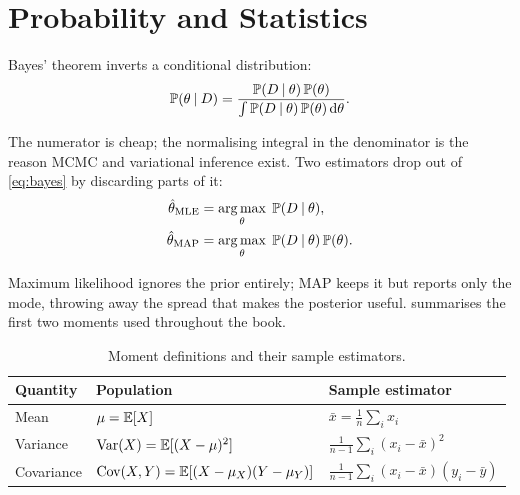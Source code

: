 \section{Probability and Statistics}
\label{sec:probability}

Bayes' theorem inverts a conditional distribution:
%
\begin{equation}
    \mathbb{P}(\theta \mathbin{\vert} D)
        = \frac{\mathbb{P}(D \mathbin{\vert} \theta)\,\mathbb{P}(\theta)}
               {\int \mathbb{P}(D \mathbin{\vert} \theta)\,\mathbb{P}(\theta)\,\mathrm{d}\theta} .
    \label{eq:bayes}
\end{equation}

The numerator is cheap; the normalising integral in the denominator is the
reason MCMC and variational inference exist. Two estimators drop out of
\cref{eq:bayes} by discarding parts of it:
%
\begin{align}
    \hat{\theta}_{\mathrm{MLE}} &= \operatorname*{arg\,max}_{\theta}\; \mathbb{P}(D \mathbin{\vert} \theta),
        \label{eq:mle} \\
    \hat{\theta}_{\mathrm{MAP}} &= \operatorname*{arg\,max}_{\theta}\; \mathbb{P}(D \mathbin{\vert} \theta)\,\mathbb{P}(\theta).
        \label{eq:map}
\end{align}

Maximum likelihood ignores the prior entirely; MAP keeps it but reports only the
mode, throwing away the spread that makes the posterior useful. 
summarises the first two moments used throughout the book.

\begin{table}[H]
    \centering
    \caption{Moment definitions and their sample estimators.}
    \label{tab:moments}
    \begin{tabular}{@{}lll@{}}
        \toprule
        Quantity & Population & Sample estimator \\
        \midrule
        Mean       & $\mu = \mathbb{E}[X]$                    & $\bar{x} = \frac{1}{n}\sum_i x_i$ \\
        Variance   & $\operatorname{Var}(X) = \mathbb{E}[(X-\mu)^2]$        & $\frac{1}{n-1}\sum_i (x_i - \bar{x})^2$ \\
        Covariance & $\operatorname{Cov}(X,Y) = \mathbb{E}[(X-\mu_X)(Y-\mu_Y)]$ & $\frac{1}{n-1}\sum_i (x_i - \bar{x})(y_i - \bar{y})$ \\
        \bottomrule
    \end{tabular}
\end{table}



